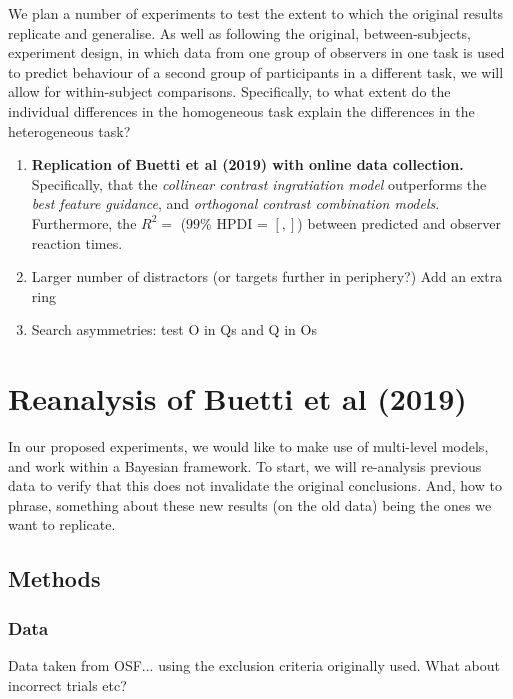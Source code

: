 We plan a number of experiments to test the extent to which the original results replicate and generalise. As well as following the original, between-subjects, experiment design, in which data from one group of observers in one task is used to predict behaviour of a second group of participants in a different task, we will allow for within-subject comparisons. Specifically, to what extent do the individual differences in the homogeneous task explain the differences in the heterogeneous task? 

\begin{enumerate}
\item \textbf{Replication of Buetti et al (2019) with online data collection.} Specifically, that the \textit{collinear contrast ingratiation model} outperforms the \textit{best feature guidance}, and \textit{orthogonal contrast combination models}.  Furthermore, the $R^2 = $ ($99\%$ HPDI = $[, ]$) between predicted and observer reaction times.\\
\item Larger number of distractors (or targets further in periphery?) Add an extra ring \\ 
\item Search asymmetries: test O in Qs and Q in Os \\
\end{enumerate}

\section{Reanalysis of Buetti et al (2019)}

In our proposed experiments, we would like to make use of multi-level models, and work within a Bayesian framework. To start, we will re-analysis previous data to verify that this does not invalidate the original conclusions. And, how to phrase, something about these new results (on the old data) being the ones we want to replicate. 

\subsection{Methods}

\subsubsection{Data}

Data taken from OSF... using the exclusion criteria originally used. What about incorrect trials etc? 

